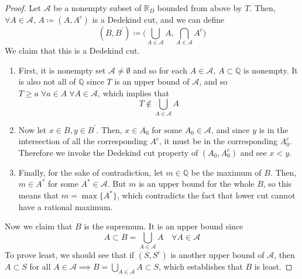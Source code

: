   \begin{proof}
    Let $\mathcal{A}$ be a nonempty subset of $\mathbb{R}_D$ bounded from above by $T$. Then, $\forall A \in \mathcal{A}$, $A \coloneqq (A, A^c)$ is a Dedekind cut, and we can define
    \begin{equation}
      (B, B^\prime) \coloneqq \bigg( \bigcup_{A \in \mathcal{A}} A, \bigcap_{A \in \mathcal{A}} A^c \bigg)
    \end{equation} 
    We claim that this is a Dedekind cut. 
    \begin{enumerate}
      \item First, it is nonempty set $\mathcal{A} \neq \emptyset$ and so for each $A \in \mathcal{A}$, $A \subset \mathbb{Q}$ is nonempty. It is also not all of $\mathbb{Q}$ since $T$ is an upper bound of $\mathcal{A}$, and so $T \geq a \; \forall a \in A \; \forall A \in \mathcal{A}$, which implies that 
      \begin{equation}
        T \not\in \bigcup_{A \in \mathcal{A}} A
      \end{equation}

      \item Now let $x \in B, y \in B^\prime$. Then, $x \in A_0$ for some $A_0 \in \mathcal{A}$, and since $y$ is in the intersection of all the corresponding $A^c$, it must be in the corresponding $A_0^c$. Therefore we invoke the Dedekind cut property of $(A_0, A_0^c)$ and see $x < y$. 

      \item Finally, for the sake of contradiction, let $m \in \mathbb{Q}$ be the maximum of $B$. Then, $m \in A^\ast$ for some $A^\ast \in \mathcal{A}$. But $m$ is an upper bound for the whole $B$, so this means that $m = \max\{A^\ast\}$, which contradicts the fact that lower cut cannot have a rational maximum. 
    \end{enumerate}
    Now we claim that $B$ is the supremum. It is an upper bound since 
    \begin{equation}
      A \subset B = \bigcup_{A \in \mathcal{A}} A \quad \forall A \in \mathcal{A}
    \end{equation}
    To prove least, we should see that if $(S, S^c)$ is another upper bound of $\mathcal{A}$, then $A \subset S$ for all $A \in \mathcal{A} \implies B = \bigcup_{A \in \mathcal{A}} A \subset S$, which establishes that $B$ is least. 
  \end{proof}


